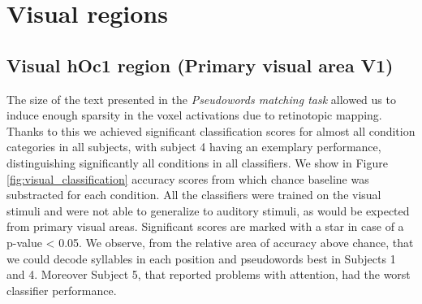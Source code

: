 \section{Visual regions}

\subsection{Visual hOc1 region (Primary visual area V1)}

The size of the text presented in the \emph{Pseudowords matching task} allowed us to induce enough sparsity in the voxel activations due to retinotopic mapping.
Thanks to this we achieved significant classification scores for almost all condition categories in all subjects, with subject 4 having an exemplary performance, distinguishing significantly all conditions in all classifiers.
We show in Figure \ref{fig:visual_classification} accuracy scores from which chance baseline was substracted for each condition.
All the classifiers were trained on the visual stimuli and were not able to generalize to auditory stimuli, as would be expected from primary visual areas.
Significant scores are marked with a star in case of a p-value < 0.05.
We observe, from the relative area of accuracy above chance, that we could decode syllables in each position and pseudowords best in Subjects 1 and 4.
Moreover Subject 5, that reported problems with attention, had the worst classifier performance.


